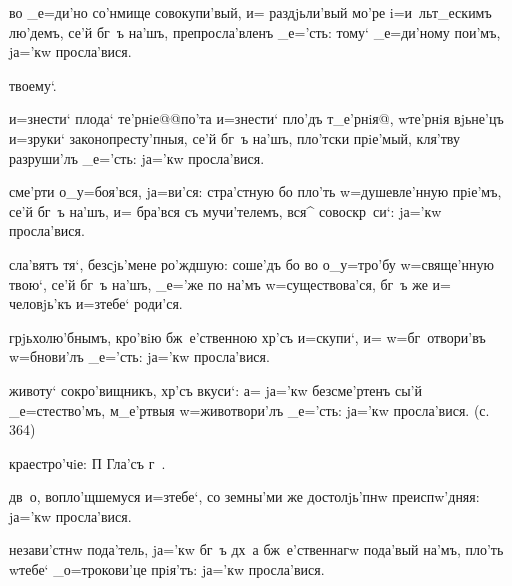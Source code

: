 

во _е=ди'но со'нмище совокупи'вый, и= раздjьли'вый мо'ре 
i=и~льт_ескимъ лю'демъ, се'й бг~ъ на'шъ, препросла'вленъ 
_е='сть: тому` _е=ди'ному пои'мъ, jа='кw просла'вися.

твоему`.

и=знести` плода` те'рнiе@{@по'та и=знести` пло'дъ 
т_е'рнiя@}, w\т те'рнiя вjьне'цъ и=з\ъ руки` 
законопресту'пныя, се'й бг~ъ на'шъ, пло'тски прiе'мый, 
кля'тву разруши'лъ _е='сть: jа='кw просла'вися.

сме'рти о_у=боя'вся, jа=ви'ся: стра'стную бо пло'ть 
w=душевле'нную прiе'мъ, се'й бг~ъ на'шъ, и= бра'вся съ 
мучи'телемъ, вся^ совоскр~си`: jа='кw просла'вися.

сла'вятъ тя`, без\ъ сjь'мене ро'ждшую: соше'дъ бо во 
о_у=тро'бу w=свяще'нную твою`, се'й бг~ъ на'шъ, _е='же по 
на'мъ w=существова'ся, бг~ъ же и= человjь'къ и=з\ъ тебе` 
роди'ся.




грjьхолю'бнымъ, кро'вiю бж~е'ственною хр'съ и=скупи`, 
и= w=бг~отвори'въ w=бнови'лъ _е='сть: jа='кw просла'вися.

животу` сокро'вищникъ, хр'съ вкуси`: а= jа='кw 
безсме'ртенъ сы'й _е=стество'мъ, м_е'ртвыя w=животвори'лъ 
_е='сть: jа='кw просла'вися. (с. 364)

краестро'чiе: П%
Гла'съ г~.%



дв~о, вопло'щшемуся и=з\ъ тебе`, со земны'ми же 
достолjь'пнw преиспw'дняя: jа='кw просла'вися.

незави'стнw пода'тель, jа='кw бг~ъ дх~а бж~е'ственнагw 
пода'вый на'мъ, пло'ть w\т тебе` _о=трокови'це прiя'тъ: 
jа='кw просла'вися.

